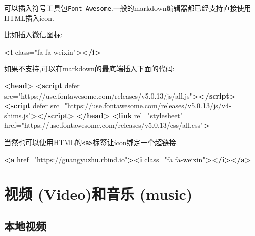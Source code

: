 \documentclass[]{ctexbook}
\newenvironment{Shaded}{\begin{snugshade}}{\end{snugshade}}
\newcommand{\KeywordTok}[1]{\textcolor[rgb]{0.13,0.29,0.53}{\textbf{#1}}}
\newcommand{\OtherTok}[1]{\textcolor[rgb]{0.56,0.35,0.01}{#1}}
\newcommand{\StringTok}[1]{\textcolor[rgb]{0.31,0.60,0.02}{#1}}
\begin{document}
可以插入符号工具包\texttt{Font\ Awesome}.一般的markdown编辑器都已经支持直接使用HTML插入icon.

比如插入微信图标:

\begin{Shaded}
\begin{Highlighting}[]
\KeywordTok{\textless{}i}\OtherTok{ class=}\StringTok{"fa fa{-}weixin"}\KeywordTok{\textgreater{}\textless{}/i\textgreater{}}
\end{Highlighting}
\end{Shaded}

如果不支持,可以在markdown的最底端插入下面的代码:

\begin{Shaded}
\begin{Highlighting}[]
\KeywordTok{\textless{}head\textgreater{}} 
    \KeywordTok{\textless{}script}\OtherTok{ defer src=}\StringTok{"https://use.fontawesome.com/releases/v5.0.13/js/all.js"}\KeywordTok{\textgreater{}\textless{}/script\textgreater{}} 
    \KeywordTok{\textless{}script}\OtherTok{ defer src=}\StringTok{"https://use.fontawesome.com/releases/v5.0.13/js/v4{-}shims.js"}\KeywordTok{\textgreater{}\textless{}/script\textgreater{}} 
\KeywordTok{\textless{}/head\textgreater{}} 
\KeywordTok{\textless{}link}\OtherTok{ rel=}\StringTok{"stylesheet"}\OtherTok{ href=}\StringTok{"https://use.fontawesome.com/releases/v5.0.13/css/all.css"}\KeywordTok{\textgreater{}}
\end{Highlighting}
\end{Shaded}

当然也可以使用HTML的\texttt{\textless{}a\textgreater{}}标签让icon绑定一个超链接.

\begin{Shaded}
\begin{Highlighting}[]
\KeywordTok{\textless{}a}\OtherTok{ href=}\StringTok{"https://guangyuzhu.rbind.io"}\KeywordTok{\textgreater{}\textless{}i}\OtherTok{ class=}\StringTok{"fa fa{-}weixin"}\KeywordTok{\textgreater{}\textless{}/i\textgreater{}\textless{}/a\textgreater{}}
\end{Highlighting}
\end{Shaded}

\hypertarget{ux89c6ux9891-videoux548cux97f3ux4e50-music}{%
\section{视频 (Video)和音乐 (music)}\label{ux89c6ux9891-videoux548cux97f3ux4e50-music}}

\hypertarget{ux672cux5730ux89c6ux9891}{%
\subsection{本地视频}\label{ux672cux5730ux89c6ux9891}}
\end{document}
